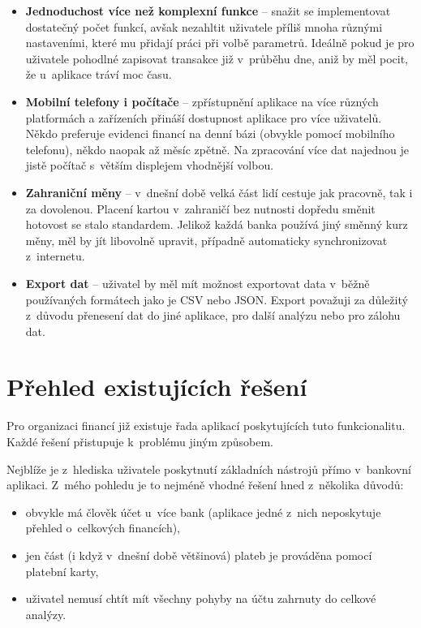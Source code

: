 \documentclass[
  biblatex,
  figures=true,
  tables=false,
  glossaries,
  index
]{kidiplom}
\begin{document}
\begin{itemize}
  \item \textbf{Jednoduchost více než komplexní funkce} -- snažit se implementovat dostatečný počet funkcí, avšak nezahltit uživatele příliš mnoha různými nastaveními, které mu přidají práci při volbě parametrů. Ideálně pokud je pro uživatele pohodlné zapisovat transakce již v~průběhu dne, aniž by měl pocit, že u~aplikace tráví moc času.
  \item \textbf{Mobilní telefony i počítače} -- zpřístupnění aplikace na více různých platformách a zařízeních přináší dostupnost aplikace pro více uživatelů. Někdo preferuje evidenci financí na denní bázi (obvykle pomocí mobilního telefonu), někdo naopak až měsíc zpětně. Na zpracování více dat najednou je jistě počítač s~větším displejem vhodnější volbou.
  \item \textbf{Zahraniční měny} -- v~dnešní době velká část lidí cestuje jak pracovně, tak i za dovolenou. Placení kartou v~zahraničí bez nutnosti dopředu směnit hotovost se stalo standardem. Jelikož každá banka používá jiný směnný kurz měny, měl by jít libovolně upravit, případně automaticky synchronizovat z~internetu.
  \item \textbf{Export dat} -- uživatel by měl mít možnost exportovat data v~běžně používaných formátech jako je CSV nebo JSON. Export považuji za důležitý z~důvodu přenesení dat do jiné aplikace, pro další analýzu nebo pro zálohu dat.
\end{itemize}

\section{Přehled existujících řešení}
Pro organizaci financí již existuje řada aplikací poskytujících tuto funkcionalitu. Každé řešení přistupuje k~problému jiným způsobem. 

Nejblíže je z~hlediska uživatele poskytnutí základních nástrojů přímo v~bankovní aplikaci. Z~mého pohledu je to nejméně vhodné řešení hned z~několika důvodů:
\begin{itemize}
  \item obvykle má člověk účet u~více bank (aplikace jedné z~nich neposkytuje přehled o~celkových financích),
  \item jen část (i když v~dnešní době většinová) plateb je prováděna pomocí platební karty,
  \item uživatel nemusí chtít mít všechny pohyby na účtu zahrnuty do celkové analýzy.
\end{itemize}
\end{document}
